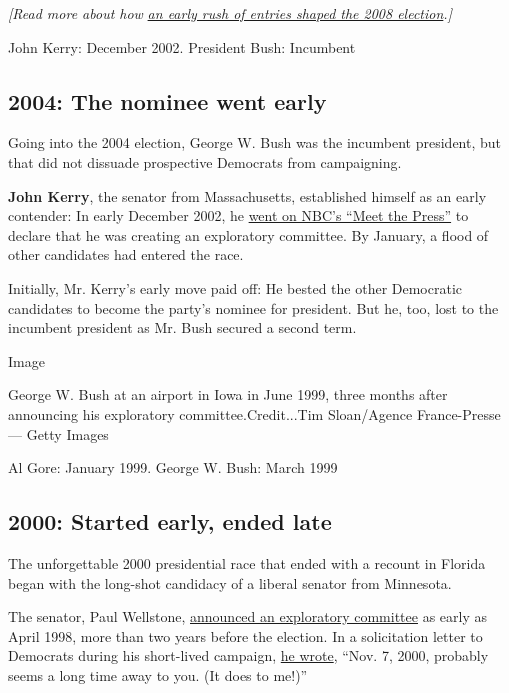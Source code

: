 \emph{{[}Read more about how}
\href{https://www.nytimes3xbfgragh.onion/2007/01/22/us/politics/22campaign.html}{\emph{an
early rush of entries shaped the 2008 election}}\emph{.{]}}

John Kerry: December 2002. President Bush: Incumbent

\hypertarget{2004-the-nominee-went-early}{%
\subsection{2004: The nominee went
early}\label{2004-the-nominee-went-early}}

Going into the 2004 election, George W. Bush was the incumbent
president, but that did not dissuade prospective Democrats from
campaigning.

\textbf{John Kerry}, the senator from Massachusetts, established himself
as an early contender: In early December 2002, he
\href{https://www.nytimes3xbfgragh.onion/2003/01/04/us/political-memo-with-no-04-front-runner-democrats-inch-toward-line.html}{went
on NBC's ``Meet the Press''} to declare that he was creating an
exploratory committee. By January, a flood of other candidates had
entered the race.

Initially, Mr. Kerry's early move paid off: He bested the other
Democratic candidates to become the party's nominee for president. But
he, too, lost to the incumbent president as Mr. Bush secured a second
term.

Image

George W. Bush at an airport in Iowa in June 1999, three months after
announcing his exploratory committee.Credit...Tim Sloan/Agence
France-Presse --- Getty Images

Al Gore: January 1999. George W. Bush: March 1999

\hypertarget{2000-started-early-ended-late}{%
\subsection{2000: Started early, ended
late}\label{2000-started-early-ended-late}}

The unforgettable 2000 presidential race that ended with a recount in
Florida began with the long-shot candidacy of a liberal senator from
Minnesota.

The senator, Paul Wellstone,
\href{https://www.nytimes3xbfgragh.onion/1998/04/09/us/minnesota-senator-may-challenge-gore.html}{announced
an exploratory committee} as early as April 1998, more than two years
before the election. In a solicitation letter to Democrats during his
short-lived campaign,
\href{https://www.nytimes3xbfgragh.onion/1998/11/27/us/one-democrat-has-hat-in-ring-and-in-hand-for-presidency.html}{he
wrote}, ``Nov. 7, 2000, probably seems a long time away to you. (It does
to me!)''

